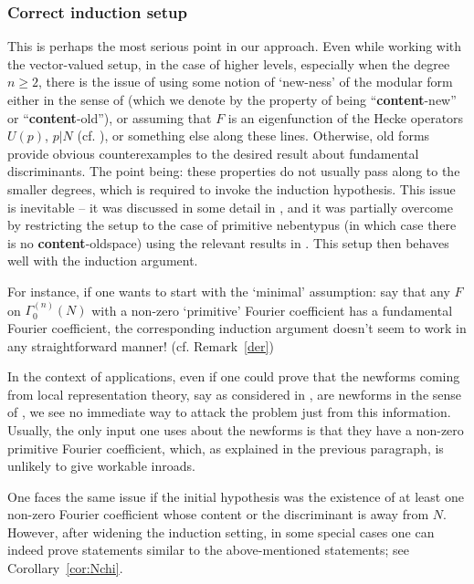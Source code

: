 \documentclass[11pt]{amsart}
\numberwithin{equation}{section}
\begin{document}
\subsubsection{Correct induction setup}
This is perhaps the most serious point in our approach.
Even while working with the vector-valued setup, in the case of higher levels, especially when the degree  $n \ge 2$, there is the issue of using some notion of `new-ness' of the modular form either in the sense of \cite{ibukiyama2012atkin} (which we denote by the property of being ``{\bf content}-new'' or ``{\bf content}-old''), or assuming that $F$ is an eigenfunction of the Hecke operators $U(p)$, $p|N$ (cf. \cite{saha2013yoshida}), or something else along these lines. Otherwise, old forms provide obvious counterexamples to the desired result about fundamental discriminants. The point being: these properties do not usually pass along to the smaller degrees, which is required to invoke the induction hypothesis.
This issue is inevitable -- it was discussed in some detail in \cite{washburn2025certain}, and it was partially overcome by restricting the setup to the case of primitive nebentypus (in which case there is no {\bf content}-oldspace) using the relevant results in \cite{ibukiyama2012atkin}. This setup then behaves well with the induction argument.

For instance, if one wants to start with the `minimal' assumption: say that any $F$ on $\Gamma_0^{(n)}(N)$ with a non-zero `primitive' Fourier coefficient has a fundamental Fourier coefficient, the corresponding induction argument doesn't seem to work in any straightforward manner! (cf. Remark~\ref{der}) 

In the context of applications, even if one could prove that the newforms coming from local representation theory, say as considered in \cite{eischen2024algebraicity}, are newforms in the sense of \cite{ibukiyama2012atkin}, we see no immediate way to attack the problem just from this information. Usually, the only input one uses about the newforms is that they have a non-zero primitive Fourier coefficient, which, as explained in the previous paragraph, is unlikely to give workable inroads.

One faces the same issue if the initial hypothesis was the existence of at least one non-zero Fourier coefficient whose content or the discriminant is away from $N$. However, after widening the induction setting, in some special cases one can indeed prove statements similar to the above-mentioned statements; see Corollary~\ref{cor:Nchi}.
\end{document}
